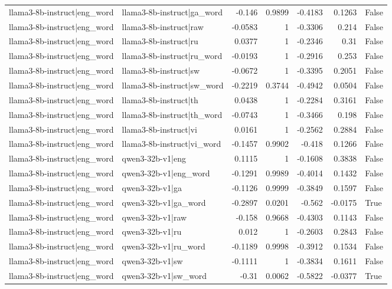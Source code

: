 \begin{table}
\begin{tabular}{l l r r r r l}
llama3-8b-instruct|eng_word & llama3-8b-instruct|ga_word & -0.146 & 0.9899 & -0.4183 & 0.1263 & False \\
llama3-8b-instruct|eng_word & llama3-8b-instruct|raw & -0.0583 & 1 & -0.3306 & 0.214 & False \\
llama3-8b-instruct|eng_word & llama3-8b-instruct|ru & 0.0377 & 1 & -0.2346 & 0.31 & False \\
llama3-8b-instruct|eng_word & llama3-8b-instruct|ru_word & -0.0193 & 1 & -0.2916 & 0.253 & False \\
llama3-8b-instruct|eng_word & llama3-8b-instruct|sw & -0.0672 & 1 & -0.3395 & 0.2051 & False \\
llama3-8b-instruct|eng_word & llama3-8b-instruct|sw_word & -0.2219 & 0.3744 & -0.4942 & 0.0504 & False \\
llama3-8b-instruct|eng_word & llama3-8b-instruct|th & 0.0438 & 1 & -0.2284 & 0.3161 & False \\
llama3-8b-instruct|eng_word & llama3-8b-instruct|th_word & -0.0743 & 1 & -0.3466 & 0.198 & False \\
llama3-8b-instruct|eng_word & llama3-8b-instruct|vi & 0.0161 & 1 & -0.2562 & 0.2884 & False \\
llama3-8b-instruct|eng_word & llama3-8b-instruct|vi_word & -0.1457 & 0.9902 & -0.418 & 0.1266 & False \\
llama3-8b-instruct|eng_word & qwen3-32b-v1|eng & 0.1115 & 1 & -0.1608 & 0.3838 & False \\
llama3-8b-instruct|eng_word & qwen3-32b-v1|eng_word & -0.1291 & 0.9989 & -0.4014 & 0.1432 & False \\
llama3-8b-instruct|eng_word & qwen3-32b-v1|ga & -0.1126 & 0.9999 & -0.3849 & 0.1597 & False \\
llama3-8b-instruct|eng_word & qwen3-32b-v1|ga_word & -0.2897 & 0.0201 & -0.562 & -0.0175 & True \\
llama3-8b-instruct|eng_word & qwen3-32b-v1|raw & -0.158 & 0.9668 & -0.4303 & 0.1143 & False \\
llama3-8b-instruct|eng_word & qwen3-32b-v1|ru & 0.012 & 1 & -0.2603 & 0.2843 & False \\
llama3-8b-instruct|eng_word & qwen3-32b-v1|ru_word & -0.1189 & 0.9998 & -0.3912 & 0.1534 & False \\
llama3-8b-instruct|eng_word & qwen3-32b-v1|sw & -0.1111 & 1 & -0.3834 & 0.1611 & False \\
llama3-8b-instruct|eng_word & qwen3-32b-v1|sw_word & -0.31 & 0.0062 & -0.5822 & -0.0377 & True \\

\end{tabular}
\end{table}
